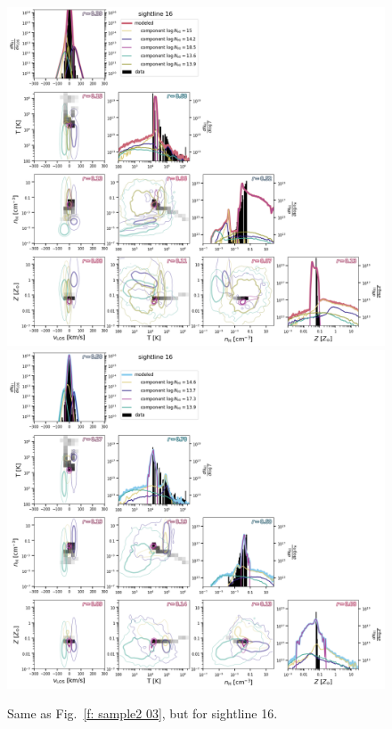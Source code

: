 \documentclass[fleqn,usenatbib]{mnras}
\begin{document}
\begin{figure}
    \centering
    \includegraphics[height=0.45\textheight]{figures/sample2/original/sightline_0016.png}
    \includegraphics[height=0.45\textheight]{figures/sample2/high-z/sightline_0016.png}
    \label{f: sample2 16}
    \caption{Same as Fig.~\ref{f: sample2 03}, but for sightline 16.}
\end{figure}
\end{document}
